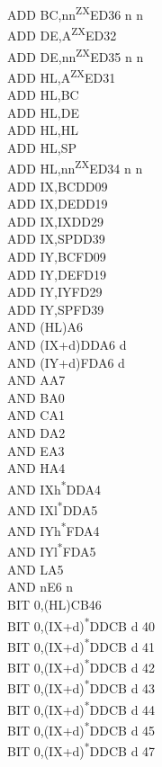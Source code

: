 \documentclass[twoside,openright,a4paper]{book}
\begin{document}
\begin{multicols}{3}
{\begin{tabbing}
	ADD BC,nn\textsuperscript{ZX}\>ED36	n n\\
	ADD DE,A\textsuperscript{ZX}\>ED32\\
	ADD DE,nn\textsuperscript{ZX}\>ED35 n n\\
	ADD HL,A\textsuperscript{ZX}\>ED31\\
	ADD HL,BC\\
	ADD HL,DE\\
	ADD HL,HL\\
	ADD HL,SP\\
	ADD HL,nn\textsuperscript{ZX}\>ED34 n n\\
	ADD IX,BC\>DD09\\
	ADD IX,DE\>DD19\\
	ADD IX,IX\>DD29\\
	ADD IX,SP\>DD39\\
	ADD IY,BC\>FD09\\
	ADD IY,DE\>FD19\\
	ADD IY,IY\>FD29\\
	ADD IY,SP\>FD39\\
	AND (HL)\>A6\\
	AND (IX+d)\>DDA6 d\\
	AND (IY+d)\>FDA6 d\\
	AND A\>A7\\
	AND B\>A0\\
	AND C\>A1\\
	AND D\>A2\\
	AND E\>A3\\
	AND H\>A4\\
	AND IXh\textsuperscript{*}\>DDA4\\
	AND IXl\textsuperscript{*}\>DDA5\\
	AND IYh\textsuperscript{*}\>FDA4\\
	AND IYl\textsuperscript{*}\>FDA5\\
	AND L\>A5\\
	AND n\>E6 n\\
	BIT 0,(HL)\>CB46\\
	BIT 0,(IX+d)\textsuperscript{*}\>DDCB d 40\\
	BIT 0,(IX+d)\textsuperscript{*}\>DDCB d 41\\
	BIT 0,(IX+d)\textsuperscript{*}\>DDCB d 42\\
	BIT 0,(IX+d)\textsuperscript{*}\>DDCB d 43\\
	BIT 0,(IX+d)\textsuperscript{*}\>DDCB d 44\\
	BIT 0,(IX+d)\textsuperscript{*}\>DDCB d 45\\
	BIT 0,(IX+d)\textsuperscript{*}\>DDCB d 47\\

\end{tabbing}}
\end{multicols}
\end{document}
